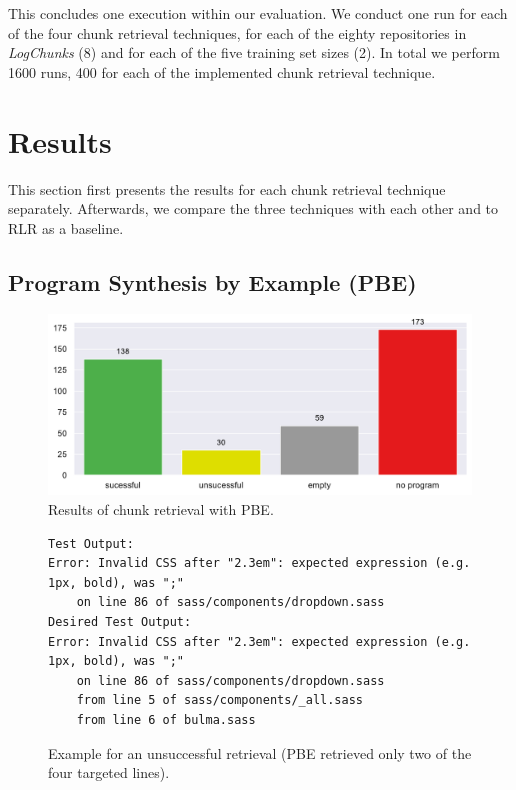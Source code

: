 This concludes one execution within our evaluation.
We conduct one run for each of the four chunk retrieval techniques,
for each of the eighty repositories in \emph{LogChunks} (8)
and for each of the five training set sizes (2).
In total we perform 1600 runs, 400 for each of the implemented chunk retrieval
technique.

\section{Results}
This section first presents the results for each chunk retrieval
technique separately.
Afterwards, we compare the three techniques with each other and to RLR as a
baseline.



\subsection{Program Synthesis by Example (PBE)}
\label{sec:r:pbe}

\begin{figure}[tbp]
		\centering
		\includegraphics[width=\columnwidth,
		clip]{img/big-study/failure-reason-pbe.pdf}
		\caption{Results of chunk retrieval with PBE.}
		\label{fig:failure-reason-PBE}
\end{figure}

\begin{figure}[!t]
  \centering
  \begin{lstlisting}[breaklines=true]
Test Output:
Error: Invalid CSS after "2.3em": expected expression (e.g.
1px, bold), was ";"
	on line 86 of sass/components/dropdown.sass
Desired Test Output:
Error: Invalid CSS after "2.3em": expected expression (e.g.
1px, bold), was ";"
	on line 86 of sass/components/dropdown.sass
	from line 5 of sass/components/_all.sass
	from line 6 of bulma.sass
  \end{lstlisting}
  \caption{Example for an unsuccessful retrieval (PBE retrieved only
  two of the four targeted lines).}
  \label{lst:pbe-unsuccessful}
\end{figure}


